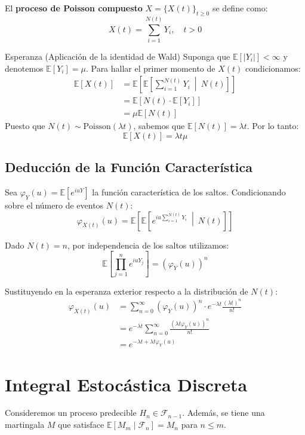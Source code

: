 \documentclass[10pt,a4paper]{article}
\begin{document}
El \textbf{proceso de Poisson compuesto} $X = \{X(t)\}_{t \ge 0}$ se define como:
\[ X(t) = \sum_{i=1}^{N(t)} Y_i , \quad t > 0 \]

\begin{alerta}{Esperanza (Aplicación de la identidad de Wald)}
Suponga que $\mathbb{E}[|Y_i|] < \infty$ y denotemos $\mathbb{E}[Y_i] = \mu$. Para hallar el primer momento de $X(t)$ condicionamos:
\begin{align*}
    \mathbb{E}[X(t)] &= \mathbb{E}\left[ \mathbb{E}\left[ \sum_{i=1}^{N(t)} Y_i \ \middle|\ N(t) \right] \right] \\
    &= \mathbb{E}[N(t) \cdot \mathbb{E}[Y_i]] \\
    &= \mu \mathbb{E}[N(t)]
\end{align*}
Puesto que $N(t) \sim \text{Poisson}(\lambda t)$, sabemos que $\mathbb{E}[N(t)] = \lambda t$. Por lo tanto:
\[ \mathbb{E}[X(t)] = \lambda t \mu \]
\end{alerta}

\subsection{Deducción de la Función Característica}
Sea $\varphi_Y(u) = \mathbb{E}[e^{iuY}]$ la función característica de los saltos. Condicionando sobre el número de eventos $N(t)$:
\[ \varphi_{X(t)}(u) = \mathbb{E}\left[ \mathbb{E}\left[ e^{iu \sum_{i=1}^{N(t)} Y_i} \ \middle|\ N(t) \right] \right] \]

Dado $N(t) = n$, por independencia de los saltos utilizamos:
\[ \mathbb{E}\left[ \prod_{j=1}^n e^{iu Y_j} \right] = (\varphi_Y(u))^n \]

Sustituyendo en la esperanza exterior respecto a la distribución de $N(t)$:
\begin{align*}
    \varphi_{X(t)}(u) &= \sum_{n=0}^\infty (\varphi_Y(u))^n \cdot e^{-\lambda t} \frac{(\lambda t)^n}{n!} \\
    &= e^{-\lambda t} \sum_{n=0}^\infty \frac{(\lambda t \varphi_Y(u))^n}{n!} \\
    &= e^{-\lambda t + \lambda t \varphi_Y(u)}
\end{align*}



\section{Integral Estocástica Discreta}

Consideremos un proceso predecible $H_n \in \mathcal{F}_{n-1}$. Además, se tiene una martingala $M$ que satisface $\mathbb{E}[M_m \mid \mathcal{F}_n] = M_n$ para $n \le m$.
\end{document}
